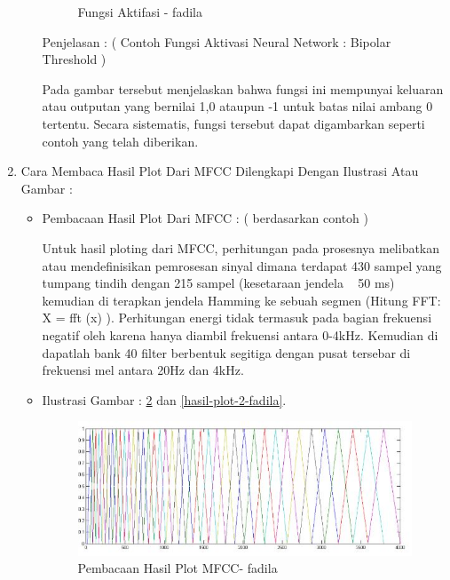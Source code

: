 \begin{enumerate}
\begin{itemize}
\begin{figure}[!hbtp]
\caption{Fungsi Aktifasi - fadila}
\label{fungsi-aktivasi-fadila}
\end{figure}
\par
\par Penjelasan : ( Contoh Fungsi Aktivasi Neural Network : Bipolar Threshold )
\par Pada gambar tersebut menjelaskan bahwa fungsi ini mempunyai keluaran atau outputan yang bernilai 1,0 ataupun -1 untuk batas nilai ambang 0 tertentu. Secara sistematis, fungsi tersebut dapat digambarkan seperti contoh yang telah diberikan.
\par
\par
\end{itemize}
\par
\par
\item Cara Membaca Hasil Plot Dari MFCC Dilengkapi Dengan Ilustrasi Atau Gambar :
\begin{itemize}
\item Pembacaan Hasil Plot Dari MFCC : ( berdasarkan contoh )
\par Untuk hasil ploting dari MFCC, perhitungan pada prosesnya melibatkan atau mendefinisikan pemrosesan sinyal dimana terdapat 430 sampel yang tumpang tindih dengan 215 sampel (kesetaraan jendela ~ 50 ms) kemudian di terapkan jendela Hamming ke sebuah segmen (Hitung FFT: X = fft (x) ). Perhitungan energi tidak termasuk pada bagian frekuensi negatif oleh karena hanya diambil frekuensi antara 0-4kHz. Kemudian di dapatlah bank 40 filter berbentuk segitiga dengan pusat tersebar di frekuensi mel antara 20Hz dan 4kHz.
\par
\item Ilustrasi Gambar : \ref{hasil-plot-1-fadila} dan \ref{hasil-plot-2-fadila}.
\par
\begin{figure}[!hbtp]
\centering
\includegraphics[scale=0.2]{figures/hasil-plot-1-fadila.jpg}
\caption{Pembacaan Hasil Plot MFCC- fadila}
\label{hasil-plot-1-fadila}
\end{figure}

\end{itemize}
\end{enumerate}
